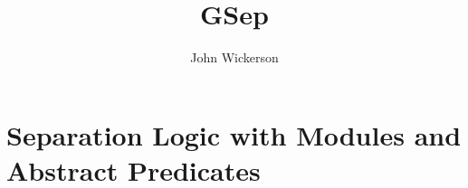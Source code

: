 \documentclass[10pt]{article}
\title{GSep}
\author{John Wickerson}
\date{}
\newcommand{\arity}{\mathop{\mathit{arity}}}
\begin{document}
\maketitle

\newcommand{\ret}{\texttt{ret}}
\newcommand{\WR}{\mathop{\mathit{wr}}}
\newcommand{\RD}{\mathop{\mathit{rd}}}

\section{Separation Logic with Modules and Abstract Predicates}

\end{document}
